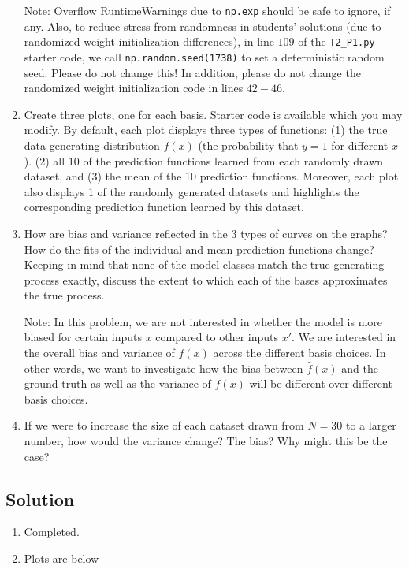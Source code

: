 \documentclass[submit]{harvardml}
\begin{document}
\begin{problem}
\begin{enumerate}
   Note: Overflow RuntimeWarnings due to \verb|np.exp| should be safe to ignore, if any. Also, to reduce stress from randomness in students' solutions (due to randomized weight initialization differences), in line $109$ of the \verb|T2_P1.py| starter code, we call \verb|np.random.seed(1738)| to set a deterministic random seed. Please do not change this! In addition, please do not change the randomized weight initialization code in lines $42-46$.

\item Create three plots, one for each basis. Starter code is available which you may modify.
By default, each plot displays three types of functions:
(1) the true data-generating distribution $f(x)$ (the probability that $y=1$ for different $x$).
(2) all 10 of the prediction functions learned from each randomly drawn dataset, and
(3) the mean of the 10 prediction functions.
Moreover, each plot also displays 1 of the randomly generated datasets and highlights the corresponding prediction function learned by this dataset.

\item How are bias and variance reflected in the 3 types of curves on
  the graphs?  How do the fits of the individual and mean prediction
  functions change?  Keeping in mind that none of the model classes
  match the true generating process exactly, discuss the extent to
  which each of the bases approximates the true process.

  Note: In this problem, we are not interested in whether the model is
  more biased for certain inputs $x$ compared to other inputs $x'$.
  We are interested in the overall bias and variance of $\hat{f}(x)$
  across the different basis choices. In other words, we want to investigate how the bias between $\hat{f}(x)$ and the ground truth as well as the variance of $\hat{f}(x)$ will be different over different basis choices. 

\item If we were to increase the size of each dataset drawn from $N = 30$ to a larger number, how would the variance change? The bias?   Why might this be the case?

\end{enumerate}

\end{problem}

\newpage

\subsection*{Solution}
\begin{enumerate}
    \item Completed.
    \item Plots are below 
\end{enumerate}
\end{document}
